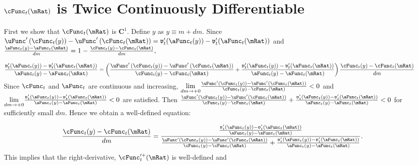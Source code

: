 \documentclass[\econtexRoot/BufferStockTheory.tex]{subfiles}
\begin{document}
\hypertarget{cFunc-is-Twice-Continuously-Differentiable}{}
\section{$\cFunc_{t}(\mRat)$ is Twice Continuously Differentiable}\label{sec:CIsTwiceDifferentiable}

First we show that $\cFunc_{t}(\mRat)$ is $\mathbf{C}^{1}.$ Define $y$ as
$y\equiv m+dm$.
  Since $\uFunc^{\prime }\left( \cFunc_{t}(y)\right) -\uFunc^{\prime }\left(
    \cFunc_{t}(\mRat)\right) =\mathfrak{v}_{t}^{\prime
  }({\aFunc}_{t}(y))-\mathfrak{v}_{t}^{\prime }({\aFunc}_{t}(\mRat))$ and $
  \frac{{\aFunc}_{t}(y)-{\aFunc}_{t}(\mRat)}{dm}=1-\frac{\cFunc_{t}(y)-\cFunc_{t}(\mRat)}{dm},$
  
\begin{align*}
  \frac{\mathfrak{v}_{t}^{\prime }({\aFunc}_{t}(y))-\mathfrak{v}_{t}^{\prime }({\aFunc}_{t}(\mRat))}{{\aFunc}_{t}(y)-{\aFunc}_{t}(\mRat)} %
  & =   
       \left( \frac{\uFunc^{\prime }\left( \cFunc_{t}(y)\right) -\uFunc^{\prime }\left( \cFunc_{t}(\mRat)\right) }{\cFunc_{t}(y)-\cFunc_{t}(\mRat)}+\frac{\mathfrak{v}_{t}^{\prime }({\aFunc}_{t}(y))-\mathfrak{v}_{t}^{\prime }({\aFunc}_{t}(\mRat))}{{\aFunc}_{t}(y)-{\aFunc}_{t}(\mRat)}\right) \frac{\cFunc_{t}(y)-\cFunc_{t}(\mRat)}{dm}
\end{align*}
Since $\cFunc_{t}$ and $\aFunc_{t}$ are continuous and increasing, $\underset{
dm\rightarrow +0}{\lim }\frac{\uFunc^{\prime }\left( \cFunc_{t}(y)\right) -\uFunc^{\prime
}\left( \cFunc_{t}(\mRat)\right) }{\cFunc_{t}(y)-\cFunc_{t}(\mRat)}<0$ and
$\underset{dm\rightarrow+0}{\lim }\frac{\mathfrak{v}_{t}^{\prime }({\aFunc}_{t}(y))-\mathfrak{v}_{t}^{\prime }({\aFunc}_{t}(\mRat))}{
{\aFunc}_{t}(y)-{\aFunc}_{t}(\mRat)}< 0$
are satisfied. Then $\frac{\uFunc^{\prime }\left(
\cFunc_{t}(y)\right) -\uFunc^{\prime }\left( \cFunc_{t}(\mRat)\right) }{\cFunc_{t}(y)-\cFunc_{t}(\mRat)}+
\frac{\mathfrak{v}_{t}^{\prime }({\aFunc}_{t}(y))-\mathfrak{v}_{t}^{\prime }({\aFunc}_{t}(\mRat))}{{\aFunc}_{t}(y)-{\aFunc}_{t}(\mRat)}
<0$ for sufficiently small $dm$.
 Hence we obtain a well-defined equation:

\begin{equation*}
\frac{\cFunc_{t}(y)-\cFunc_{t}(\mRat)}{dm}=\frac{\frac{\mathfrak{v}_{t}^{\prime
}({\aFunc}_{t}(y))-\mathfrak{v}_{t}^{\prime }({\aFunc}_{t}(\mRat))}{{\aFunc}_{t}(y)-{\aFunc}_{t}(\mRat)}}{\frac{\uFunc^{\prime
}\left( \cFunc_{t}(y)\right) -\uFunc^{\prime }\left( \cFunc_{t}(\mRat)\right) }{
\cFunc_{t}(y)-\cFunc_{t}(\mRat)}+\frac{\mathfrak{v}_{t}^{\prime }({\aFunc}_{t}(y))-\mathfrak{v}_{t}^{\prime }({\aFunc}_{t}(\mRat))
}{{\aFunc}_{t}(y)-{\aFunc}_{t}(\mRat)}}.
\end{equation*}
This implies that the right-derivative, $\cFunc_{t}^{\prime +}(\mRat)$ is
well-defined and
\end{document}
